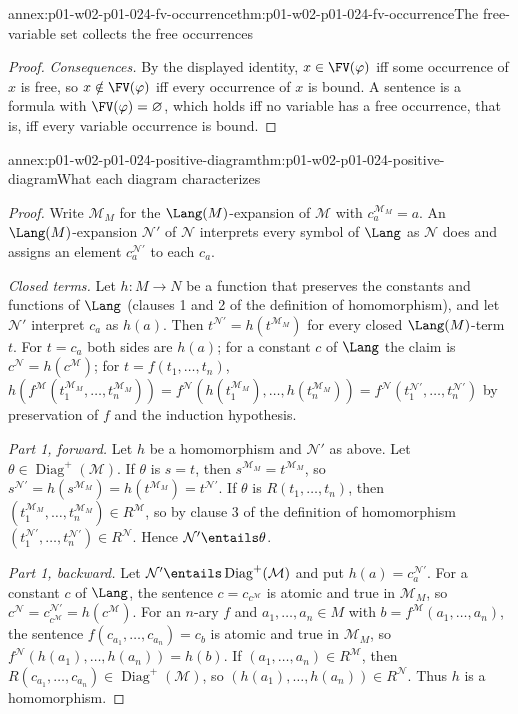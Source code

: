 \begin{annexitem}{annex:p01-w02-p01-024-fv-occurrence}{thm:p01-w02-p01-024-fv-occurrence}{The free-variable set collects the free occurrences}
\begin{proof}
\emph{Consequences.}  By the displayed identity, \(x\in\FV(\varphi)\) iff
some occurrence of \(x\) is free, so \(x\notin\FV(\varphi)\) iff every
occurrence of \(x\) is bound.  A sentence is a formula with
\(\FV(\varphi)=\varnothing\), which holds iff no variable has a free
occurrence, that is, iff every variable occurrence is bound.
\end{proof}
\end{annexitem}

\begin{annexitem}{annex:p01-w02-p01-024-positive-diagram}{thm:p01-w02-p01-024-positive-diagram}{What each diagram characterizes}
\begin{proof}
Write \(\mathcal M_M\) for the \(\Lang(M)\)-expansion of
\(\mathcal M\) with \(c_a^{\mathcal M_M}=a\).  An \(\Lang(M)\)-expansion
\(\mathcal N'\) of \(\mathcal N\) interprets every symbol of \(\Lang\) as
\(\mathcal N\) does and assigns an element \(c_a^{\mathcal N'}\) to each
\(c_a\).

\emph{Closed terms.}  Let \(h:M\to N\) be a function that preserves the
constants and functions of \(\Lang\) (clauses 1 and 2 of the definition of
homomorphism), and let \(\mathcal N'\) interpret \(c_a\) as \(h(a)\).  Then
\(t^{\mathcal N'}=h(t^{\mathcal M_M})\) for every closed
\(\Lang(M)\)-term \(t\).  For \(t=c_a\) both sides are \(h(a)\); for a
constant \(c\) of \(\Lang\) the claim is \(c^{\mathcal N}=h(c^{\mathcal M})\);
for \(t=f(t_1,\ldots,t_n)\),
\(h(f^{\mathcal M}(t_1^{\mathcal M_M},\ldots,t_n^{\mathcal M_M}))
=f^{\mathcal N}(h(t_1^{\mathcal M_M}),\ldots,h(t_n^{\mathcal M_M}))
=f^{\mathcal N}(t_1^{\mathcal N'},\ldots,t_n^{\mathcal N'})\) by
preservation of \(f\) and the induction hypothesis.

\emph{Part 1, forward.}  Let \(h\) be a homomorphism and \(\mathcal N'\) as
above.  Let \(\theta\in\operatorname{Diag}^+(\mathcal M)\).  If \(\theta\)
is \(s=t\), then \(s^{\mathcal M_M}=t^{\mathcal M_M}\), so
\(s^{\mathcal N'}=h(s^{\mathcal M_M})=h(t^{\mathcal M_M})=t^{\mathcal N'}\).
If \(\theta\) is \(R(t_1,\ldots,t_n)\), then
\((t_1^{\mathcal M_M},\ldots,t_n^{\mathcal M_M})\in R^{\mathcal M}\), so
by clause 3 of the definition of homomorphism
\((t_1^{\mathcal N'},\ldots,t_n^{\mathcal N'})\in R^{\mathcal N}\).  Hence
\(\mathcal N'\entails\theta\).

\emph{Part 1, backward.}  Let
\(\mathcal N'\entails\operatorname{Diag}^+(\mathcal M)\) and put
\(h(a)=c_a^{\mathcal N'}\).  For a constant \(c\) of \(\Lang\), the
sentence \(c=c_{c^{\mathcal M}}\) is atomic and true in \(\mathcal M_M\), so
\(c^{\mathcal N}=c_{c^{\mathcal M}}^{\mathcal N'}=h(c^{\mathcal M})\).  For
an \(n\)-ary \(f\) and \(a_1,\ldots,a_n\in M\) with
\(b=f^{\mathcal M}(a_1,\ldots,a_n)\), the sentence
\(f(c_{a_1},\ldots,c_{a_n})=c_b\) is atomic and true in \(\mathcal M_M\), so
\(f^{\mathcal N}(h(a_1),\ldots,h(a_n))=h(b)\).  If
\((a_1,\ldots,a_n)\in R^{\mathcal M}\), then
\(R(c_{a_1},\ldots,c_{a_n})\in\operatorname{Diag}^+(\mathcal M)\), so
\((h(a_1),\ldots,h(a_n))\in R^{\mathcal N}\).  Thus \(h\) is a
homomorphism.


\end{proof}
\end{annexitem}
